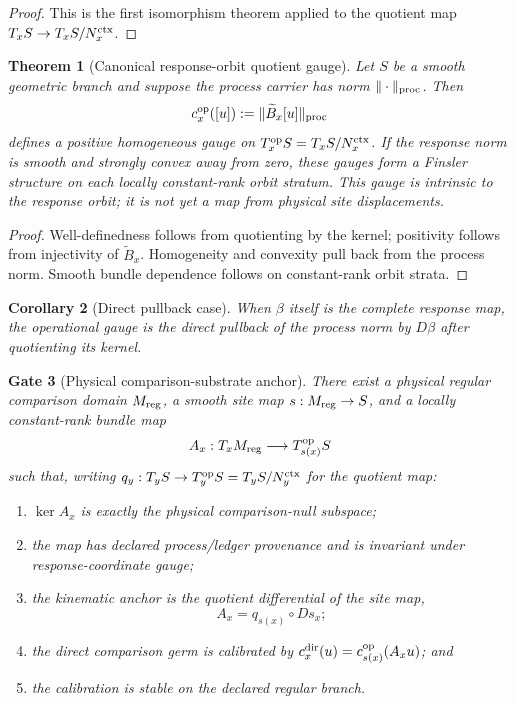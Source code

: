 \documentclass[11pt]{article}
\newtheorem{theorem}{Theorem}[section]
\newtheorem{corollary}[theorem]{Corollary}
\newtheorem{gate}[theorem]{Gate}
\theoremstyle{remark}
\begin{document}
\begin{proof}
This is the first isomorphism theorem applied to the quotient map
$T_xS\to T_xS/N_x^{\rm ctx}$.
\end{proof}

\begin{theorem}[Canonical response-orbit quotient gauge]
\label{thm:canonical-operational-anchor}
Let $S$ be a smooth geometric branch and suppose the process carrier has norm
$\|\cdot\|_{\rm proc}$.  Then
\[
        c_x^{\rm op}([u])
        :=\|\widetilde B_x[u]\|_{\rm proc}
\]
defines a positive homogeneous gauge on $T_x^{\rm op}S=T_xS/N_x^{\rm ctx}$.  If the response norm
is smooth and strongly convex away from zero, these gauges form a Finsler
structure on each locally constant-rank orbit stratum.  This gauge is intrinsic
to the response orbit; it is not yet a map from physical site displacements.
\end{theorem}

\begin{proof}
Well-definedness follows from quotienting by the kernel; positivity follows
from injectivity of $\widetilde B_x$.  Homogeneity and convexity pull back from
the process norm.  Smooth bundle dependence follows on constant-rank orbit
strata.
\end{proof}

\begin{corollary}[Direct pullback case]
\label{cor:direct-pullback-anchor}
When $\beta$ itself is the complete response map, the operational gauge is the
direct pullback of the process norm by $D\beta$ after quotienting its kernel.
\end{corollary}

\begin{gate}[Physical comparison-substrate anchor]
\label{gate:physical-substrate-anchor}
There exist a physical regular comparison domain $M_{\rm reg}$, a smooth site
map $s:M_{\rm reg}\to S$, and a locally constant-rank bundle map
\[
  A_x:T_xM_{\rm reg}\longrightarrow T_{s(x)}^{\rm op}S
\]
such that, writing
$q_y:T_yS\to T_y^{\rm op}S=T_yS/N_y^{\rm ctx}$ for the quotient map:
\begin{enumerate}[label=(\roman*)]
\item $\ker A_x$ is exactly the physical comparison-null subspace;
\item the map has declared process/ledger provenance and is invariant under
response-coordinate gauge;
\item the kinematic anchor is the quotient differential of the site map,
\[
  A_x=q_{s(x)}\circ Ds_x;
\]
\item the direct comparison germ is calibrated by
$c_x^{\rm dir}(u)=c_{s(x)}^{\rm op}(A_xu)$; and
\item the calibration is stable on the declared regular branch.
\end{enumerate}
\end{gate}
\end{document}
